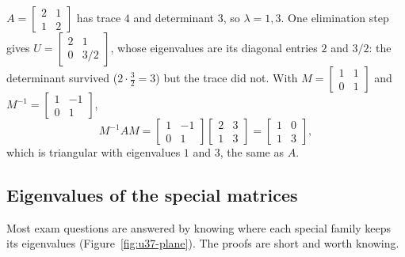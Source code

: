 \begin{example}\label{ex:u37-elim}
$A=\begin{bmatrix}2&1\\1&2\end{bmatrix}$ has trace $4$ and determinant $3$, so $\lambda=1,3$. One elimination step gives $U=\begin{bmatrix}2&1\\0&3/2\end{bmatrix}$, whose eigenvalues are its diagonal entries $2$ and $3/2$: the determinant survived ($2\cdot\tfrac32=3$) but the trace did not. With $M=\begin{bmatrix}1&1\\0&1\end{bmatrix}$ and $M^{-1}=\begin{bmatrix}1&-1\\0&1\end{bmatrix}$,
\[
M^{-1}AM=\begin{bmatrix}1&-1\\0&1\end{bmatrix}\begin{bmatrix}2&3\\1&3\end{bmatrix}=\begin{bmatrix}1&0\\1&3\end{bmatrix},
\]
which is triangular with eigenvalues $1$ and $3$, the same as $A$.
\end{example}

\subsection{Eigenvalues of the special matrices}

Most exam questions are answered by knowing where each special family keeps its eigenvalues (Figure~\ref{fig:u37-plane}). The proofs are short and worth knowing.

